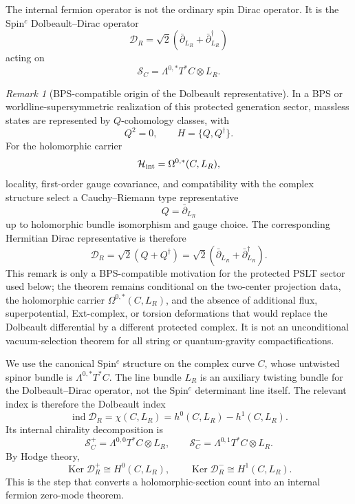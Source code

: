 \documentclass[aps,prd,preprint,notitlepage,nofootinbib,superscriptaddress,floatfix]{revtex4-2}
\newcommand{\Ker}{\operatorname{Ker}}
\newcommand{\cH}{\mathcal H}
\newcommand{\cS}{\mathcal S}
\newcommand{\scrD}{\mathscr D}
\theoremstyle{remark}
\newtheorem{remark}{Remark}
\begin{document}
The internal fermion operator is not the ordinary spin Dirac operator.
It is the Spin\(^c\) Dolbeault--Dirac operator
\begin{equation}
\boxed{
\scrD_R
=
\sqrt2
\left(
\bar\partial_{L_R}
+\bar\partial_{L_R}^\dagger
\right)
}
\label{eq:Dolbeault_Dirac}
\end{equation}
acting on
\begin{equation}
\cS_C
=
\Lambda^{0,*}T^*C\otimes L_R.
\label{eq:spinc_spinor_bundle}
\end{equation}
\begin{remark}[BPS-compatible origin of the Dolbeault representative]
In a BPS or worldline-supersymmetric realization of this protected generation sector, massless states are represented by \(Q\)-cohomology classes, with
\begin{equation}
Q^2=0,
\qquad
H=\{Q,Q^\dagger\}.
\end{equation}
For the holomorphic carrier
\begin{equation}
\cH_{\rm int}=\Omega^{0,*}(C,L_R),
\end{equation}
locality, first-order gauge covariance, and compatibility with the complex structure select a Cauchy--Riemann type representative
\begin{equation}
Q=\bar\partial_{L_R}
\end{equation}
up to holomorphic bundle isomorphism and gauge choice.
The corresponding Hermitian Dirac representative is therefore
\begin{equation}
\scrD_R=\sqrt2(Q+Q^\dagger)
=
\sqrt2(\bar\partial_{L_R}+\bar\partial_{L_R}^{\dagger}).
\end{equation}
This remark is only a BPS-compatible motivation for the protected PSLT sector used below; the theorem remains conditional on the two-center projection data, the holomorphic carrier \(\Omega^{0,*}(C,L_R)\), and the absence of additional flux, superpotential, Ext-complex, or torsion deformations that would replace the Dolbeault differential by a different protected complex.
It is not an unconditional vacuum-selection theorem for all string or quantum-gravity compactifications.
\end{remark}
We use the canonical Spin\(^c\) structure on the complex curve \(C\), whose untwisted spinor bundle is \(\Lambda^{0,*}T^*C\).
The line bundle \(L_R\) is an auxiliary twisting bundle for the Dolbeault--Dirac operator, not the Spin\(^c\) determinant line itself.
The relevant index is therefore the Dolbeault index
\begin{equation}
\operatorname{ind}\scrD_R
=
\chi(C,L_R)
=
h^0(C,L_R)-h^1(C,L_R).
\label{eq:dolbeault_index}
\end{equation}
Its internal chirality decomposition is
\begin{equation}
\cS_C^+
=
\Lambda^{0,0}T^*C\otimes L_R,
\qquad
\cS_C^-
=
\Lambda^{0,1}T^*C\otimes L_R.
\label{eq:chirality_decomp}
\end{equation}
By Hodge theory,
\begin{equation}
\boxed{
\Ker\scrD_R^+
\cong
H^0(C,L_R),
\qquad
\Ker\scrD_R^-
\cong
H^1(C,L_R).
}
\label{eq:hodge_kernel}
\end{equation}
This is the step that converts a holomorphic-section count into an internal fermion zero-mode theorem.
\end{document}
